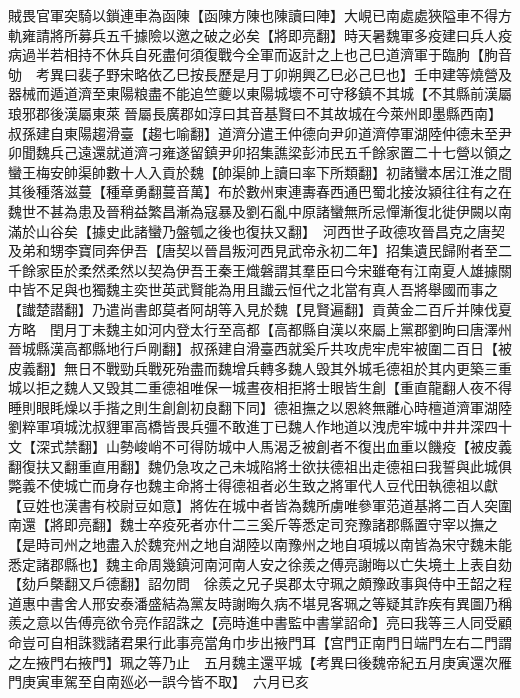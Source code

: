 賊畏官軍突騎以鎖連車為函陳【函陳方陳也陳讀曰陣】大峴已南處處狹隘車不得方軌雍請將所募兵五千據險以邀之破之必矣【將即亮翻】時天暑魏軍多疫建曰兵人疫病過半若相持不休兵自死盡何須復戰今全軍而返計之上也己巳道濟軍于臨朐【朐音劬　考異曰裴子野宋略依乙巳按長歷是月丁卯朔興乙巳必己巳也】壬申建等燒營及器械而遁道濟至東陽粮盡不能追竺夔以東陽城壞不可守移鎮不其城【不其縣前漢屬琅邪郡後漢屬東萊晉屬長廣郡如淳曰其音基賢曰不其故城在今萊州即墨縣西南】叔孫建自東陽趨滑臺【趨七喻翻】道濟分遣王仲德向尹卯道濟停軍湖陸仲德未至尹卯聞魏兵己遠還就道濟刁雍遂留鎮尹卯招集譙梁彭沛民五千餘家置二十七營以領之　蠻王梅安帥渠帥數十人入貢於魏【帥渠帥上讀曰率下所類翻】初諸蠻本居江淮之間其後種落滋蔓【種章勇翻蔓音萬】布於數州東連夀春西通巴蜀北接汝潁往往有之在魏世不甚為患及晉稍益繁昌漸為寇暴及劉石亂中原諸蠻無所忌憚漸復北徙伊闕以南滿於山谷矣【據史此諸蠻乃盤瓠之後也復扶又翻】　河西世子政德攻晉昌克之唐契及弟和甥李寶同奔伊吾【唐契以晉昌叛河西見武帝永初二年】招集遺民歸附者至二千餘家臣於柔然柔然以契為伊吾王秦王熾磐謂其羣臣曰今宋雖奄有江南夏人雄據關中皆不足與也獨魏主奕世英武賢能為用且䜟云恒代之北當有真人吾將舉國而事之【䜟楚譛翻】乃遣尚書郎莫者阿胡等入見於魏【見賢遍翻】貢黄金二百斤并陳伐夏方略　閏月丁未魏主如河内登太行至高都【高都縣自漢以來屬上黨郡劉昫曰唐澤州晉城縣漢高都縣地行戶剛翻】叔孫建自滑臺西就奚斤共攻虎牢虎牢被圍二百日【被皮義翻】無日不戰勁兵戰死殆盡而魏增兵轉多魏人毁其外城毛德祖於其内更築三重城以拒之魏人又毁其二重德祖唯保一城晝夜相拒將士眼皆生創【重直龍翻人夜不得睡則眼眊燥以手揩之則生創創初良翻下同】德祖撫之以恩終無離心時檀道濟軍湖陸劉粹軍項城沈叔貍軍高橋皆畏兵彊不敢進丁已魏人作地道以洩虎牢城中井井深四十文【深式禁翻】山勢峻峭不可得防城中人馬渴乏被創者不復出血重以饑疫【被皮義翻復扶又翻重直用翻】魏仍急攻之己未城陷將士欲扶德祖出走德祖曰我誓與此城俱斃義不使城亡而身存也魏主命將士得德祖者必生致之將軍代人豆代田執德祖以獻【豆姓也漢書有校尉豆如意】將佐在城中者皆為魏所虜唯參軍范道基將二百人突圍南還【將即亮翻】魏士卒疫死者亦什二三奚斤等悉定司兖豫諸郡縣置守宰以撫之【是時司州之地盡入於魏兖州之地自湖陸以南豫州之地自項城以南皆為宋守魏未能悉定諸郡縣也】魏主命周幾鎮河南河南人安之徐羨之傅亮謝晦以亡失境土上表自劾【劾戶槩翻又戶德翻】詔勿問　徐羨之兄子吳郡太守珮之頗豫政事與侍中王韶之程道惠中書舍人邢安泰潘盛結為黨友時謝晦久病不堪見客珮之等疑其詐疾有異圖乃稱羨之意以告傅亮欲令亮作詔誅之【亮時進中書監中書掌詔命】亮曰我等三人同受顧命豈可自相誅戮諸君果行此事亮當角巾步出掖門耳【宫門正南門日端門左右二門謂之左掖門右掖門】珮之等乃止　五月魏主還平城【考異曰後魏帝紀五月庚寅還次雁門庚寅車駕至自南廵必一誤今皆不取】　六月已亥

